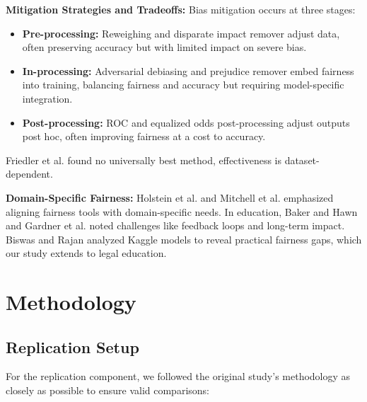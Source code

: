 \documentclass[10pt,journal,compsoc]{IEEEtran}
\begin{document}
\textbf{Mitigation Strategies and Tradeoffs:} Bias mitigation occurs at three stages:
\begin{itemize}
\item \textbf{Pre-processing:} Reweighing\cite{5} and disparate impact remover\cite{6} adjust data, often preserving accuracy but with limited impact on severe bias.
\item \textbf{In-processing:} Adversarial debiasing\cite{14} and prejudice remover\cite{15} embed fairness into training, balancing fairness and accuracy but requiring model-specific integration.
\item \textbf{Post-processing:} ROC\cite{11} and equalized odds post-processing\cite{2} adjust outputs post hoc, often improving fairness at a cost to accuracy.
\end{itemize}
Friedler et al.\cite{7} found no universally best method, effectiveness is dataset-dependent.

\textbf{Domain-Specific Fairness:} Holstein et al.\cite{16} and Mitchell et al.\cite{17} emphasized aligning fairness tools with domain-specific needs. In education, Baker and Hawn\cite{18} and Gardner et al.\cite{19} noted challenges like feedback loops and long-term impact. Biswas and Rajan\cite{11} analyzed Kaggle models to reveal practical fairness gaps, which our study extends to legal education.

\section{Methodology}
\subsection{Replication Setup}
For the replication component, we followed the original study's methodology as closely as possible to ensure valid comparisons:

\begin{table}[!t]
\caption{The datasets used in the fairness experimentation. PA: Protected attribute}
\label{table:datasets}
\centering
{}
\end{table}
\end{document}
